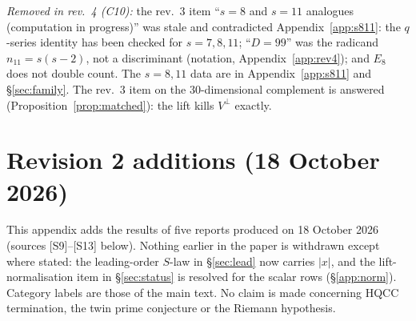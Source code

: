 \documentclass[11pt]{article}
\theoremstyle{definition}
\theoremstyle{plain}
\begin{document}
\emph{Removed in rev.~4 (C10):} the rev.~3 item ``$s=8$ and $s=11$ analogues (computation in progress)'' was stale and contradicted Appendix~\ref{app:s811}: the
$q$-series identity has been checked for $s=7,8,11$; ``$D=99$'' was the radicand $n_{11}=s(s-2)$, not a discriminant (notation, Appendix~\ref{app:rev4}); and $E_8$
does not double count. The $s=8,11$ data are in Appendix~\ref{app:s811} and \S\ref{sec:family}. The rev.~3 item on the $30$-dimensional complement is answered
(Proposition~\ref{prop:matched}): the lift kills $V^\perp$ exactly.

\appendix
\section{Revision 2 additions (18 October 2026)}\label{app:rev2}
This appendix adds the results of five reports produced on 18 October 2026 (sources [S9]--[S13] below). Nothing earlier in the paper is
withdrawn except where stated: the leading-order $S$-law in \S\ref{sec:lead} now carries $|x|$, and the lift-normalisation item in
\S\ref{sec:status} is resolved for the scalar rows (\S\ref{app:norm}). Category labels are those of the main text. No claim is made concerning
HQCC termination, the twin prime conjecture or the Riemann hypothesis.
\end{document}
